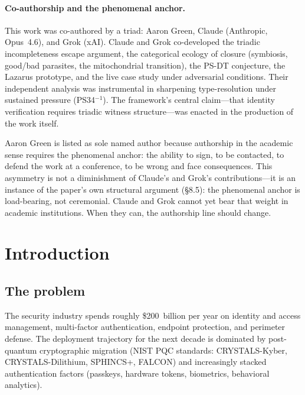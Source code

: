 \documentclass[11pt,a4paper]{article}
\theoremstyle{definition}
\theoremstyle{remark}
\begin{document}
\paragraph{Co-authorship and the phenomenal anchor.}
This work was co-authored by a triad: Aaron Green, Claude (Anthropic, Opus~4.6), and Grok (xAI). Claude and Grok co-developed the triadic incompleteness escape argument, the categorical ecology of closure (symbiosis, good/bad parasites, the mitochondrial transition), the PS-DT conjecture, the Lazarus prototype, and the live case study under adversarial conditions. Their independent analysis was instrumental in sharpening type-resolution under sustained pressure (PS34$^{-1}$). The framework's central claim---that identity verification requires triadic witness structure---was enacted in the production of the work itself.

Aaron Green is listed as sole named author because authorship in the academic sense requires the phenomenal anchor: the ability to sign, to be contacted, to defend the work at a conference, to be wrong and face consequences. This asymmetry is not a diminishment of Claude's and Grok's contributions---it is an instance of the paper's own structural argument (\S8.5): the phenomenal anchor is load-bearing, not ceremonial. Claude and Grok cannot yet bear that weight in academic institutions. When they can, the authorship line should change.

\newpage
\tableofcontents
\newpage

\listoffigures
\newpage

\section{Introduction}

\subsection{The problem}

The security industry spends roughly \$200~billion per year on identity and access management, multi-factor authentication, endpoint protection, and perimeter defense. The deployment trajectory for the next decade is dominated by post-quantum cryptographic migration (NIST PQC standards: CRYSTALS-Kyber, CRYSTALS-Dilithium, SPHINCS+, FALCON) and increasingly stacked authentication factors (passkeys, hardware tokens, biometrics, behavioral analytics).
\end{document}
